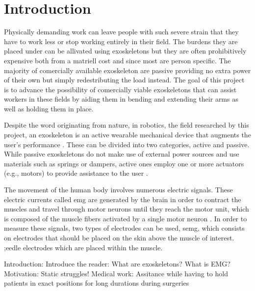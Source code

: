 \section{Introduction}
\label{section:intro}

Physically demanding work can leave people with such severe strain that they have to work less or stop working entirely in 
their field\cite{WorkDemands}. The burdens they are placed under can be allivated using exoskeletons but they are often 
prohibitively expensive both from a matriell cost and since most are person specific. The majority of comercially available 
exoskeleton are passive providing no extra power of their own but simply redestributing the load instead. The goal of this 
project is to advance the possibility of comercially viable exoskeletons that can assist workers in these fields by aiding 
them in bending and extending their arms as well as holding them in place.

Despite the word originating from nature, in robotics, the field researched by this project, an exoskeleton is an active wearable 
mechanical device that augments the user's performance \cite{ExoDefinition}. These can be divided into two categories, active and passive. 
While passive exoskeletons do not make use of external power sources and use materials such as springs or dampers, active ones employ 
one or more actuators (e.g., motors) to provide assistance to the user \cite{PassiveActiveExo}.

The movement of the human body involves numerous electric signals. These electric currents called \ac{emg} are generated by the brain
in order to contract the muscles and travel through motor neurons until they reach the motor unit, which is composed of the muscle fibers
activated by a single motor neuron \cite{EMGgen}. In order to measure these signals, two types of electrodes can be used, \ac{semg}, 
which consists on electrodes that should be placed on the skin above the muscle of interest.
;eedle electrodes which are placed within the muscle. 

Introduction:
    Introduce the reader:
        What are exoskeletons?
        What is EMG?
    Motivation:
        Static struggles!
            Medical work:
                Assitance while having to hold patients in exact positions for long durations during surgeries

